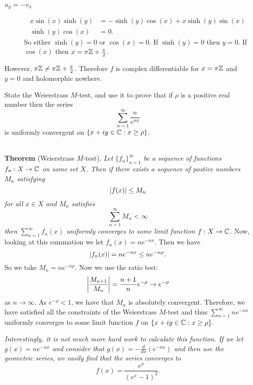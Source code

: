 \begin{parts}
\begin{solution}
\begin{description}
            \item[$u_y = -v_x$]
                \begin{align*}
                    x\sin(x)\sinh(y)
                    &= -\sinh(y)\cos(x) + x\sinh(y)\sin(x) \\
                    \sinh(y)\cos(x) &= 0.
                \end{align*}
                So either $\sinh(y) = 0$ or $\cos(x) = 0$.
                If $\sinh(y) = 0$ then $y = 0$.
                If $\cos(x)$ then $x = \pi \mathbb{Z} + \frac\pi2$.
        \end{description}
        However, $\pi \mathbb{Z} \neq \pi \mathbb{Z} +  \frac\pi2$.
        Therefore $f$ is complex differentiable 
        for $x = \pi\mathbb{Z}$ and $y = 0$
        and holomorphic nowhere.
    \end{solution}
\end{parts}

\question
State the Weierstrass $M$-test,
and use it to prove that if $\rho$ is a positive real number
then the series
\[
    \sum^{\infty}_{n=1} \frac{n}{e^{nx}} 
\]
is uniformly convergent on $\{x+iy\in\mathbb{C} : x \geq \rho\}$.
\begin{solution}
    \hfill \\
    \textbf{Theorem} (Weierstrass $M$-test).
    \textit{
        \hspace{-7pt} Let $\{f_n\}_{n=1}^\infty$ 
        be a sequence of functions $f_n: X \to \mathbb{C}$
        on some set $X$.
        Then if there exists a sequence of postive numbers $M_n$
        satisfying
        \[
            \left\lvert f(x)\right\rvert \leq M_n
        \]
        for all $x \in X$ and $M_n$ satisfies
        \[
            \sum^{\infty}_{n=1} M_n < \infty
        \]
        then $ \sum^{\infty}_{n=1} f_n(x) $
        uniformly converges to some limit function $f: X \to \mathbb{C}$.
    }
    Now, looking at this summation we
    let $f_n(x) = ne^{-nx}$.
    Then we have
    \[
        \left\lvert f_n(x)\right\rvert = ne^{-nx} \leq ne^{-n\rho}.
    \]
    So we take $M_n = ne^{-n\rho}$.
    Now we use the ratio test:
    \[
        \left\lvert
            \frac{M_{n+1}}{M_n}
        \right\rvert
        = \frac{n+1}{n} e^{-\rho}
        \to e^{-\rho}
    \]
    as $n \to \infty$. 
    As $e^{-\rho} < 1$, 
    we have that $M_n$ is absolutely convergent.
    Therefore, we have satisfied all the constraints of the
    Weierstrass $M$-test
    and thus $\sum_{n=1}^\infty ne^{-nx}$ uniformly converges
    to some limit function $f$ on
    $\{x + iy \in \mathbb{C} : x \geq \rho\}$.

    \emph{
        \hspace{-7pt} Interestingly, it is not much more hard work to calculate
        this function.
        If we let
        $g(x) = ne^{-nx}$
        and consider that
        $g(x) = - \frac{d}{dx} \left( e^{-nx} \right)$
        and then use the geometric series, 
        we easily find that the series converges to
        \[
            f(x) = \frac{e^x}{(e^x - 1)^2}.
        \]
    }
\end{solution}

